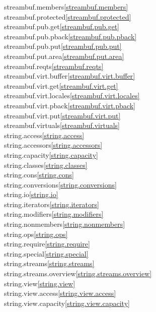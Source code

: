\begin{multicols}{2}
streambuf.members\quad\ref{streambuf.members}\\
streambuf.protected\quad\ref{streambuf.protected}\\
streambuf.pub.get\quad\ref{streambuf.pub.get}\\
streambuf.pub.pback\quad\ref{streambuf.pub.pback}\\
streambuf.pub.put\quad\ref{streambuf.pub.put}\\
streambuf.put.area\quad\ref{streambuf.put.area}\\
streambuf.reqts\quad\ref{streambuf.reqts}\\
streambuf.virt.buffer\quad\ref{streambuf.virt.buffer}\\
streambuf.virt.get\quad\ref{streambuf.virt.get}\\
streambuf.virt.locales\quad\ref{streambuf.virt.locales}\\
streambuf.virt.pback\quad\ref{streambuf.virt.pback}\\
streambuf.virt.put\quad\ref{streambuf.virt.put}\\
streambuf.virtuals\quad\ref{streambuf.virtuals}\\
string.access\quad\ref{string.access}\\
string.accessors\quad\ref{string.accessors}\\
string.capacity\quad\ref{string.capacity}\\
string.classes\quad\ref{string.classes}\\
string.cons\quad\ref{string.cons}\\
string.conversions\quad\ref{string.conversions}\\
string.io\quad\ref{string.io}\\
string.iterators\quad\ref{string.iterators}\\
string.modifiers\quad\ref{string.modifiers}\\
string.nonmembers\quad\ref{string.nonmembers}\\
string.ops\quad\ref{string.ops}\\
string.require\quad\ref{string.require}\\
string.special\quad\ref{string.special}\\
string.streams\quad\ref{string.streams}\\
string.streams.overview\quad\ref{string.streams.overview}\\
string.view\quad\ref{string.view}\\
string.view.access\quad\ref{string.view.access}\\
string.view.capacity\quad\ref{string.view.capacity}\\

\end{multicols}
